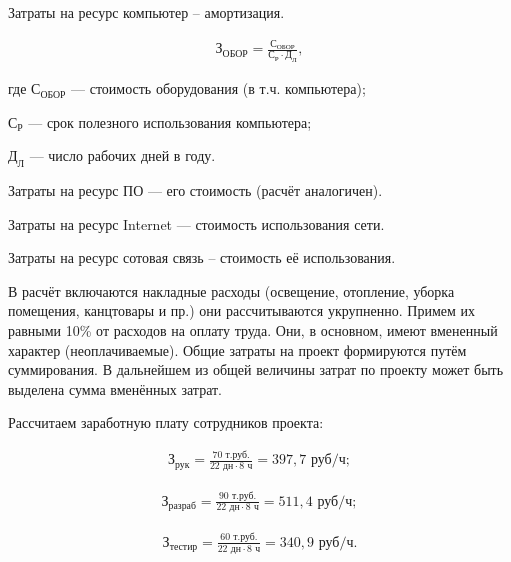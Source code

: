 Затраты на ресурс компьютер – амортизация.

\begin{equation}
	\begin{aligned}
		\text{З}_\text{ОБОР}=\frac{\text{С}_\text{ОБОР}}{\text{С}_\text{Р} \cdot \text{Д}_\text{Л}} ,
	\end{aligned}
	\label{F:maschineprice}
\end{equation}

где $\text{С}_\text{ОБОР}$ --- стоимость оборудования (в т.ч. компьютера);

$\text{С}_\text{Р}$ --- срок полезного использования компьютера;

$\text{Д}_\text{Л}$ --- число рабочих дней в году.

Затраты на ресурс ПО --- его стоимость (расчёт аналогичен).

Затраты на ресурс Internet --- стоимость использования сети.

Затраты на ресурс сотовая связь – стоимость её использования.

В расчёт включаются накладные расходы (освещение, отопление, уборка помещения, канцтовары и пр.) они рассчитываются укрупненно. Примем их равными 10\% от расходов на оплату труда. Они, в основном, имеют вмененный характер (неоплачиваемые).
Общие затраты на проект формируются путём суммирования. В дальнейшем из общей величины затрат по проекту может быть выделена сумма вменённых затрат.

Рассчитаем заработную плату сотрудников проекта:

\begin{equation}
	\begin{aligned}
		\text{З}_\text{рук}=\frac{70 \text{ т.руб.}}{22 \text{ дн} \cdot 8 \text{ ч}}=397,7\text{ руб/ч} ;
	\end{aligned}
\end{equation}

\begin{equation}
	\begin{aligned}
		\text{З}_\text{разраб}=\frac{90 \text{ т.руб.}}{22 \text{ дн} \cdot 8 \text{ ч}}=511,4\text{ руб/ч} ;
	\end{aligned}
\end{equation}

\begin{equation}
	\begin{aligned}
		\text{З}_\text{тестир}=\frac{60 \text{ т.руб.}}{22 \text{ дн} \cdot 8 \text{ ч}}=340,9\text{ руб/ч} .
	\end{aligned}
\end{equation}

